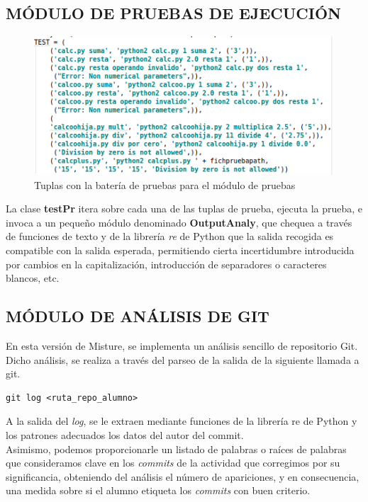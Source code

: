 \subsection{MÓDULO DE PRUEBAS DE EJECUCIÓN}

\begin{figure}[H]
   \centering
   \includegraphics[width=16cm]{img/Selection_024_testcodigo}
   \caption{Tuplas con la batería de pruebas para el módulo de pruebas}
   \label{figura:testcodigo}
\end{figure}

La clase \textbf{testPr} itera sobre cada una de las tuplas de prueba, ejecuta la prueba, e invoca a un pequeño módulo denominado \textbf{OutputAnaly}, que chequea a través de funciones de texto y de la librería \textit{re} de Python que la salida recogida es compatible con la salida esperada, permitiendo cierta incertidumbre introducida por cambios en la capitalización, introducción de separadores o caracteres blancos, etc.

\subsection{MÓDULO DE ANÁLISIS DE GIT}


En esta versión de Misture, se implementa un análisis sencillo de repositorio Git. Dicho análisis, se realiza a través del parseo de la salida de la siguiente llamada a git.
\begin{verbatim}
git log <ruta_repo_alumno>
\end{verbatim}
A la salida del \textit{log}, se le extraen mediante funciones de la librería re de Python y los patrones adecuados los datos del autor del commit.\\


Asimismo, podemos proporcionarle un listado de palabras o raíces de palabras que consideramos clave en los \textit{commits} de la actividad que corregimos por su significancia, obteniendo  del análisis el número de apariciones, y en consecuencia, una medida sobre si el alumno etiqueta los \textit{commits} con buen criterio.


